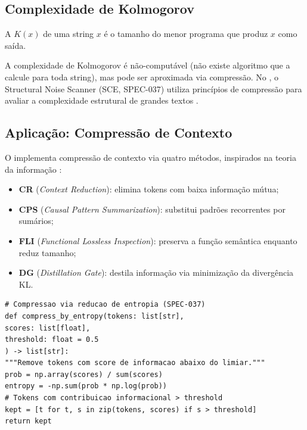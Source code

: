 \subsection{Complexidade de Kolmogorov}
\begin{definicao}
A  $K(x)$ de uma string $x$ é o
tamanho do menor programa que produz $x$ como saída.
\end{definicao}
\begin{observacao}
A complexidade de Kolmogorov é não-computável (não existe algoritmo que
a calcule para toda string), mas pode ser aproximada via compressão. No
\opencodeeco{}, o Structural Noise Scanner (SCE, SPEC-037) utiliza
princípios de compressão para avaliar a complexidade estrutural de
grandes textos \cite{opencode2026spec036, opencode2026ecosystem}.
\end{observacao}
\subsection{Aplicação: Compressão de Contexto}
O \opencodeeco{} implementa compressão de contexto via quatro métodos,
inspirados na teoria da informação \cite{cover2006elements}:
\begin{itemize}
\item \textbf{CR} (\textit{Context Reduction}): elimina tokens com baixa
informação mútua;
\item \textbf{CPS} (\textit{Causal Pattern Summarization}): substitui
padrões recorrentes por sumários;
\item \textbf{FLI} (\textit{Functional Lossless Inspection}): preserva
a função semântica enquanto reduz tamanho;
\item \textbf{DG} (\textit{Distillation Gate}): destila informação via
minimização da divergência KL.
\end{itemize}
\begin{lstlisting}[style=pythonstyle]
# Compressao via reducao de entropia (SPEC-037)
def compress_by_entropy(tokens: list[str],
scores: list[float],
threshold: float = 0.5
) -> list[str]:
"""Remove tokens com score de informacao abaixo do limiar."""
prob = np.array(scores) / sum(scores)
entropy = -np.sum(prob * np.log(prob))
# Tokens com contribuicao informacional > threshold
kept = [t for t, s in zip(tokens, scores) if s > threshold]
return kept
\end{lstlisting}
